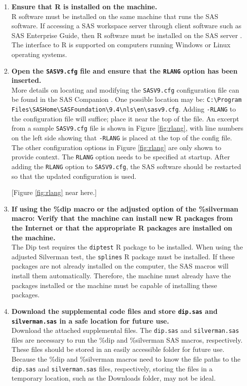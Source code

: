 \documentclass[]{interact}
\theoremstyle{plain}%
\theoremstyle{definition}
\theoremstyle{remark}
\begin{document}
\begin{enumerate}
\item \textbf{Ensure that R is installed on the machine.} \\
R software must be installed on the same machine that runs the SAS software. If accessing a SAS workspace server through client software such as SAS Enterprise Guide, then R software must be installed on the SAS server \citep[p.~240]{SAS-rlang}. The interface to R is supported on computers running Windows or Linux operating systems.

\item \textbf{Open the \texttt{SASV9.cfg} file and ensure that the \texttt{RLANG} option has been inserted.} \\
More details on locating and modifying the \texttt{SASV9.cfg} configuration file can be found in the SAS Companion \citep[p.~12]{SAS-config}. One possible location may be: \texttt{C:\textbackslash Program Files\textbackslash SASHome\textbackslash SASFoundation\textbackslash 9.4\textbackslash nls\textbackslash en\textbackslash sasv9.cfg}.
Adding \texttt{-RLANG} to the configuration file will suffice; place it near the top of the file. An excerpt from a sample \texttt{SASV9.cfg} file is shown in Figure \ref{fig:rlang}, with line numbers on the left side showing that \texttt{-RLANG} is placed at the top of the config file. The other configuration options in Figure \ref{fig:rlang} are only shown to provide context. The \texttt{RLANG} option needs to be specified at startup. After adding the \texttt{RLANG} option to \texttt{SASV9.cfg}, the SAS software should be restarted so that the updated configuration is used. 

[Figure \ref{fig:rlang} near here.]

\item \textbf{If using the \%dip macro or the adjusted option of the \%silverman macro: Verify that the machine can install new R packages from the Internet or that the appropriate R packages are installed on the machine.} \\
The Dip test requires the \texttt{diptest} R package to be installed. When using the adjusted Silverman test, the \texttt{splines} R package must be installed. If these packages are not already installed on the computer, the SAS macros will install them automatically. Therefore, the machine must already have the packages installed or the machine must be capable of installing these packages.

\item \textbf{Download the supplemental code files and store \texttt{dip.sas} and \texttt{silverman.sas} in a safe location for future use.} \\
Download the attached supplemental files. The \texttt{dip.sas} and \texttt{silverman.sas} files are necessary to run the \%dip and \%silverman SAS macros, respectively. These files should be stored in an easily accessible folder for future use. Because the \%dip and \%silverman macros need to know the file paths to the \texttt{dip.sas} and \texttt{silverman.sas} files,  respectively, storing the files in a temporary location, such as the Downloads folder, may not be ideal.


\end{enumerate}
\end{document}
